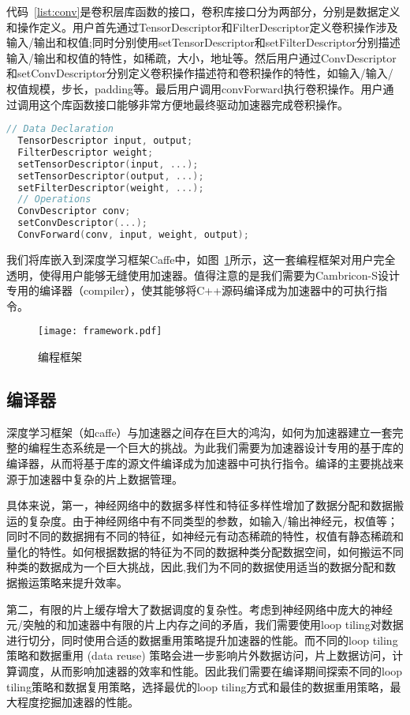 代码~\ref{list:conv}是卷积层库函数的接口，卷积库接口分为两部分，分别是数据定义和操作定义。用户首先通过TensorDescriptor和FilterDescriptor定义卷积操作涉及输入/输出和权值;同时分别使用setTensorDescriptor和setFilterDescriptor分别描述输入/输出和权值的特性，如稀疏，大小，地址等。然后用户通过ConvDescriptor和setConvDescriptor分别定义卷积操作描述符和卷积操作的特性，如输入/输入/权值规模，步长，padding等。最后用户调用convForward执行卷积操作。用户通过调用这个库函数接口能够非常方便地最终驱动加速器完成卷积操作。

\begin{lstlisting}[language=C, frame=single, basicstyle=\footnotesize, caption=卷积层库函数接口, label=list:conv, captionpos=b]
  // Data Declaration
  TensorDescriptor input, output;
  FilterDescriptor weight;
  setTensorDescriptor(input, ...);
  setTensorDescriptor(output, ...);
  setFilterDescriptor(weight, ...);
  // Operations
  ConvDescriptor conv;
  setConvDescriptor(...);
  ConvForward(conv, input, weight, output);
\end{lstlisting}

我们将库嵌入到深度学习框架Caffe中，如图~\ref{fig:framework}所示，这一套编程框架对用户完全透明，使得用户能够无缝使用加速器。值得注意的是我们需要为Cambricon-S设计专用的编译器（compiler），使其能够将C++源码编译成为加速器中的可执行指令。

\begin{figure}
\centering
\texttt{[image: framework.pdf]}
\caption{编程框架}
\label{fig:framework}
\end{figure}

\subsection{编译器}
深度学习框架（如caffe）与加速器之间存在巨大的鸿沟，如何为加速器建立一套完整的编程生态系统是一个巨大的挑战。为此我们需要为加速器设计专用的基于库的编译器，从而将基于库的源文件编译成为加速器中可执行指令。编译的主要挑战来源于加速器中复杂的片上数据管理。

具体来说，第一，神经网络中的数据多样性和特征多样性增加了数据分配和数据搬运的复杂度。由于神经网络中有不同类型的参数，如输入/输出神经元，权值等；同时不同的数据拥有不同的特征，如神经元有动态稀疏的特性，权值有静态稀疏和量化的特性。如何根据数据的特征为不同的数据种类分配数据空间，如何搬运不同种类的数据成为一个巨大挑战，因此,我们为不同的数据使用适当的数据分配和数据搬运策略来提升效率。

第二，有限的片上缓存增大了数据调度的复杂性。考虑到神经网络中庞大的神经元/突触的和加速器中有限的片上内存之间的矛盾，我们需要使用loop tiling对数据进行切分，同时使用合适的数据重用策略提升加速器的性能。而不同的loop tiling策略和数据重用 (data reuse) 策略会进一步影响片外数据访问，片上数据访问，计算调度，从而影响加速器的效率和性能。因此我们需要在编译期间探索不同的loop tiling策略和数据复用策略，选择最优的loop tiling方式和最佳的数据重用策略，最大程度挖掘加速器的性能。

